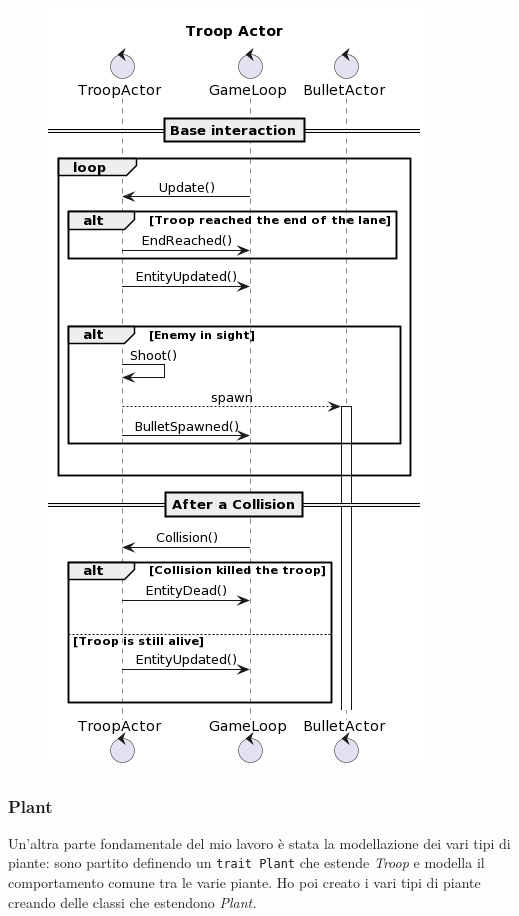 \begin{figure}[H]
    \centering
    \includegraphics[width=0.8\linewidth]{images/troop-actor.png}
    \label{Diagramma di sequenza del Troop Actor.}
\end{figure}

\subsubsection{Plant}
Un'altra parte fondamentale del mio lavoro è stata la modellazione dei vari tipi di piante: sono partito definendo un \texttt{trait Plant} che estende \textit{Troop} e modella il comportamento comune tra le varie piante. Ho poi creato i vari tipi di piante creando delle classi che estendono \textit{Plant.}

